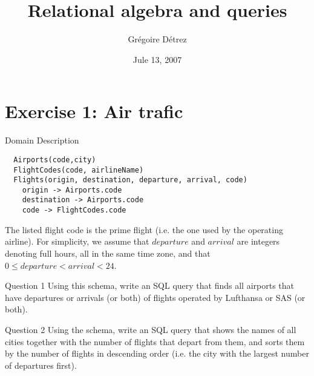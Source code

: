 \documentclass{beamer}
\title[Tutorial 3]{Relational algebra and queries}
\author{Gr\'egoire D\'etrez}
\date{Jule 13, 2007}
\begin{document}
\begin{frame}
  \titlepage
\end{frame}

\section{Exercise 1: Air trafic}

\begin{frame}[fragile]{Domain Description}
\begin{verbatim}
  Airports(code,city)
  FlightCodes(code, airlineName)
  Flights(origin, destination, departure, arrival, code)
    origin -> Airports.code
    destination -> Airports.code
    code -> FlightCodes.code
\end{verbatim}

The listed flight code is the prime flight (i.e. the one used by the operating
airline). For simplicity, we assume that $departure$ and $arrival$
are integers denoting full hours, all in the same time zone, and that
$0 \le departure < arrival < 24$.
\end{frame}

\begin{frame}{Question 1}
Using this schema, write an SQL query that finds all airports that have
departures or arrivals (or both) of flights operated by Lufthansa or SAS (or
both).
\end{frame}

\begin{frame}{Question 2}
Using the schema, write an SQL query that shows the names of all cities
together with the number of flights that depart from them, and sorts them by
the number of flights in descending order (i.e. the city with the largest
number of departures first).
\end{frame}
\end{document}
